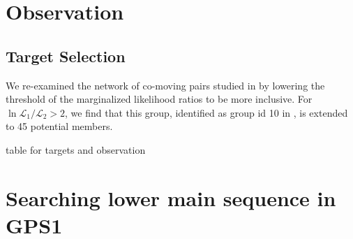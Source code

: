 \documentclass[modern,letterpaper]{aastex61}
\begin{document}

\section{Observation}
\label{sec:observation}

\subsection{Target Selection}
\label{sub:target_selection}

We re-examined the network of co-moving pairs studied in \citealt{2017AJ....153..257O} by
lowering the threshold of the marginalized likelihood ratios to be more inclusive.
For $\ln{\mathcal{L}_1}/{\mathcal{L}_2}>2$, we find that this group,
identified as group id 10 in \citealt{2017AJ....153..257O}, is extended to 45 potential members.

table for targets and observation




\section{Searching lower main sequence in GPS1}
\label{sec:searching_lower_main_sequence_in_gps1}


\end{document}
